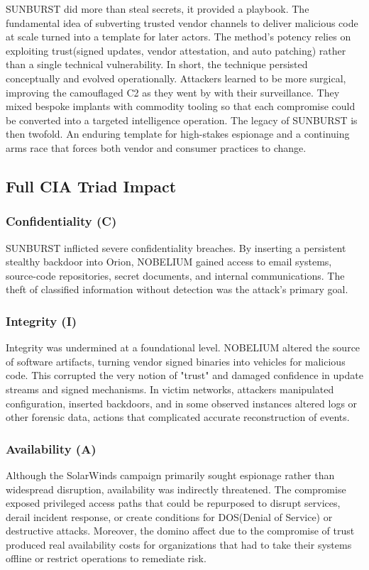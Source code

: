 \documentclass[conference]{IEEEtran}
\begin{document}
SUNBURST did more than steal secrets, it provided a playbook. The fundamental idea of subverting trusted vendor channels to deliver malicious code at
scale turned into a template for later actors. The method's potency relies on exploiting trust(signed updates, vendor attestation, and auto patching)
rather than a single technical vulnerability. In short, the technique persisted conceptually and evolved operationally. Attackers learned to be more
surgical, improving the camouflaged C2 as they went by with their surveillance. They mixed bespoke implants with commodity tooling so that each compromise
could be converted into a targeted intelligence operation. The legacy of SUNBURST is then twofold. An enduring template for high-stakes espionage and
a continuing arms race that forces both vendor and consumer practices to change.
\subsection{Full CIA Triad Impact}
\subsubsection*{Confidentiality (C)}
SUNBURST inflicted severe confidentiality breaches. By inserting a persistent stealthy backdoor into Orion, NOBELIUM gained access to email systems,
source-code repositories, secret documents, and internal communications. The theft of classified information without detection was the attack's primary
goal.
\subsubsection*{Integrity (I)}
Integrity was undermined at a foundational level. NOBELIUM altered the source of software artifacts, turning vendor signed binaries into vehicles
for malicious code. This corrupted the very notion of "trust" and damaged confidence in update streams and signed mechanisms. In victim networks,
attackers manipulated configuration, inserted backdoors, and in some observed instances altered logs or other forensic data, actions that complicated
accurate reconstruction of events.
\subsubsection*{Availability (A)}
Although the SolarWinds campaign primarily sought espionage rather than widespread disruption, availability was indirectly threatened. The compromise
exposed privileged access paths that could be repurposed to disrupt services, derail incident response, or create conditions for DOS(Denial of Service)
or destructive attacks. Moreover, the domino affect due to the compromise of trust produced real availability costs for organizations that had to take
their systems offline or restrict operations to remediate risk.
\end{document}
